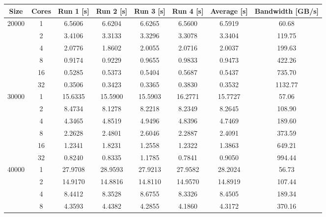 \begin{tabularx}{\textwidth}{@{} c c c c c c c c @{}}
\caption{\label{table:transposition}Matrix transposition - run times and bandwidth}\\
\toprule
    \textbf{Size} & \textbf{Cores} & \textbf{Run 1 [s]} & \textbf{Run 2 [s]} & %
    \textbf{Run 3 [s]} & \textbf{Run 4 [s]} & \textbf{Average [s]} & \textbf{Bandwidth [GB/s]}\\
\midrule
\endhead
    \multirow{6}{*}{20000} & 1  & 6.5606 & 6.6204 & 6.6265 & 6.5600 & 6.5919 & 60.68   \\
                           & 2  & 3.4106 & 3.3133 & 3.3296 & 3.3078 & 3.3404 & 119.75  \\
                           & 4  & 2.0776 & 1.8602 & 2.0055 & 2.0716 & 2.0037 & 199.63  \\
                           & 8  & 0.9174 & 0.9229 & 0.9655 & 0.9833 & 0.9473 & 422.26  \\
                           & 16 & 0.5285 & 0.5373 & 0.5404 & 0.5687 & 0.5437 & 735.70  \\
                           & 32 & 0.3506 & 0.3423 & 0.3365 & 0.3830 & 0.3532 & 1132.77 \\
\midrule
    \multirow{6}{*}{30000} & 1  & 15.6335 & 15.5900 & 15.5903 & 16.2771 & 15.7727 & 57.06  \\
                           & 2  & 8.4734  & 8.1278  & 8.2218  & 8.2349  & 8.2645  & 108.90 \\
                           & 4  & 4.3465  & 4.8519  & 4.9496  & 4.8396  & 4.7469  & 189.60 \\
                           & 8  & 2.2628  & 2.4801  & 2.6046  & 2.2887  & 2.4091  & 373.59 \\
                           & 16 & 1.2341  & 1.8231  & 1.2558  & 1.2322  & 1.3863  & 649.21 \\
                           & 32 & 0.8240  & 0.8335  & 1.1785  & 0.7841  & 0.9050  & 994.44 \\
\midrule
    \multirow{6}{*}{40000} & 1  & 27.9708 & 28.9593 & 27.9213 & 27.9582 & 28.2024 & 56.73  \\
                           & 2  & 14.9170 & 14.8816 & 14.8110 & 14.9570 & 14.8919 & 107.44 \\
                           & 4  & 8.4412  & 8.3528  & 8.6755  & 8.3326  & 8.4505  & 189.34 \\
                           & 8  & 4.3593  & 4.4382  & 4.2855  & 4.1860  & 4.3172  & 370.16 \\

\end{tabularx}
